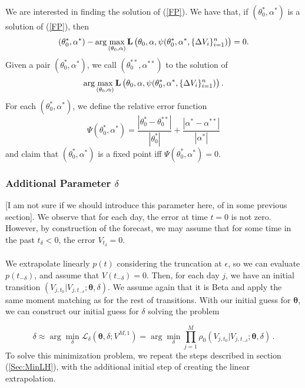 \documentclass[11pt]{article}
\theoremstyle{definition}
\begin{document}
We are interested in finding the solution of (\ref{FP}). We have that, if $(\theta_0^*,\alpha^*)$ is a solution of (\ref{FP}), then
\begin{equation*}
(\theta_0^*,\alpha^*)-\arg\max_{(\theta_0,\alpha)}\mathbf{L}\left(\theta_0,\alpha,\psi({\color{black}\theta_0^*},{\color{black}\alpha^*},\{\Delta V_i\}_{i=1}^n)\right)=0.
\end{equation*}
Given a pair $(\theta_0^{*},\alpha^{*})$, we call $(\theta_0^{**},\alpha^{**})$ to the solution of
\begin{equation*}
\arg\max_{(\theta_0,\alpha)}\mathbf{L}\left(\theta_0,\alpha,\psi({\color{black}\theta_0^*},{\color{black}\alpha^*},\{\Delta V_i\}_{i=1}^n)\right).
\end{equation*}
For each $(\theta_0^{*},\alpha^{*})$, we define the relative error function
\begin{equation*}
\Psi(\theta_0^{*},\alpha^{*})=\frac{|\theta_0^{*}-\theta_0^{**}|}{|\theta_0^{*}|}+\frac{|\alpha^{*}-\alpha^{**}|}{|\alpha^{*}|}
\end{equation*}
and claim that $(\theta_0^*,\alpha^*)$ is a fixed point iff $\Psi(\theta_0^*,\alpha^*)=0$.

\subsubsection{Additional Parameter $\delta$}

{\color{red}[I am not sure if we should introduce this parameter here, of in some previous section].} We observe that for each day, the error at time $t=0$ is not zero. However, by construction of the forecast, we may assume that for some time in the past $t_\delta<0$, the error $V_{t_\delta}=0$.\\
\quad\\
We extrapolate linearly $p(t)$ considering the truncation at $\epsilon$, so we can evaluate $p(t_{-\delta})$, and assume that $V(t_{-\delta})=0$. Then, for each day $j$, we have an initial transition $(V_{j, t_0}|V_{j, t_{-\delta}};\bm{\theta},\delta)$. We assume again that it is Beta and apply the same moment matching as for the rest of transitions. With our initial guess for $\bm{\theta}$, we can construct our initial guess for $\delta$ solving the problem

\begin{equation*}
\delta\approx\arg\min_{\delta}\mathcal{L}_{\delta}(\bm{\theta},\delta; V^{M,1}) = \arg\min_{\delta}\prod\limits_{j=1}^M \rho_0 (V_{j, t_0}|V_{j, t_{-\delta}};\bm{\theta},\delta) \,.
\label{likelihood_delta}
\end{equation*}
To solve this minimization problem, we repeat the steps described in section (\ref{Sec:MinLH}), with the additional initial step of creating the linear extrapolation.
\end{document}
